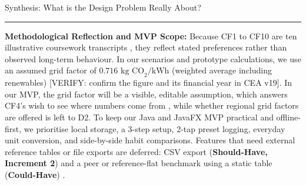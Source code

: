 \documentclass[12pt, a4paper]{article}
\begin{document}
\begin{synthesisbox}{Synthesis: What is the Design Problem Really About?}
\vspace{2pt}\hrule\vspace{3pt}
\textbf{Methodological Reflection and MVP Scope:} Because CF1 to CF10 are ten illustrative coursework transcripts \cite{cf1, cf10}, they reflect stated preferences rather than observed long-term behaviour. In our scenarios and prototype calculations, we use an assumed grid factor of $0.716\text{ kg CO}_2/\text{kWh}$ (weighted average including renewables) [VERIFY: confirm the figure and its financial year in CEA v19]. In our MVP, the grid factor will be a visible, editable assumption, which answers CF4's wish to see where numbers come from \cite{cf4}, while whether regional grid factors are offered is left to D2. To keep our Java and JavaFX MVP practical and offline-first, we prioritise local storage, a 3-step setup, 2-tap preset logging, everyday unit conversion, and side-by-side habit comparisons. Features that need external reference tables or file exports are deferred: CSV export (\textbf{Should-Have, Increment 2}) \cite{cf4} and a peer or reference-flat benchmark using a static table (\textbf{Could-Have}) \cite{cf2}.
\end{synthesisbox}
\end{document}
